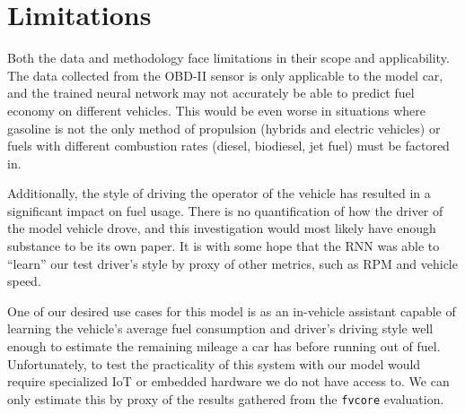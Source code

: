 \documentclass[letterpaper]{article}
\begin{document}
\section{Limitations}
Both the data and methodology face limitations in their scope and 
applicability. The data collected from the OBD-II sensor is only 
applicable to the model car, and the trained neural network may not 
accurately be able to predict fuel economy on different vehicles. This 
would be even worse in situations where gasoline is not the only method 
of propulsion (hybrids and electric vehicles) or fuels with different
combustion rates (diesel, biodiesel, jet fuel) must be factored in.

Additionally, the style of driving the operator of the vehicle has 
resulted in a significant impact on fuel usage. There is no 
quantification of how the driver of the model vehicle drove, and this 
investigation would most likely have enough substance to be its own paper. 
It is with some hope that the RNN was able to ``learn'' our test driver's 
style by proxy of other metrics, such as RPM and vehicle speed.

One of our desired use cases for this model is as an in-vehicle assistant 
capable of learning the vehicle's average fuel consumption and driver's 
driving style well enough to estimate the remaining mileage a car has 
before running out of fuel. Unfortunately, to test the practicality of 
this system with our model would require specialized IoT or embedded 
hardware we do not have access to. We can only estimate this by proxy of 
the results gathered from the \verb|fvcore| evaluation.

 

\end{document}
